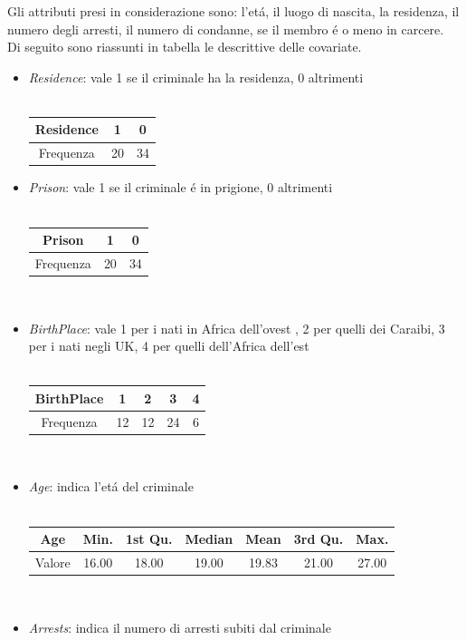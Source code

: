 \documentclass[11pt,a4paper]{report}
\begin{document}
Gli attributi presi in considerazione sono: l'et\'a, il luogo di nascita, la residenza, il numero degli arresti, il numero di condanne, se il membro \'e o meno in carcere.
\\
Di seguito sono riassunti in tabella le descrittive delle covariate.
\begin{itemize}
	\item \emph{Residence}: vale 1 se il criminale ha la residenza, 0 altrimenti\\\\
\begin{tabular}{c|c|c}
	\hline 
	\textbf{Residence} & 1  & 0  \\ 
	\hline 
	Frequenza & 20  &34  \\ 
	\hline 
\end{tabular} 
	\item \emph{Prison}:  vale 1 se il criminale \'e in prigione, 0 altrimenti\\\\
\begin{tabular}{c|c|c}
	\hline 
	\textbf{Prison} & 1  & 0  \\ 
	\hline 
	Frequenza & 20  &34  \\ 
	\hline 
\end{tabular} 
\\
	\item \emph{BirthPlace}: vale 1 per i nati in Africa dell'ovest , 2 per quelli dei Caraibi, 3 per i nati negli UK, 4 per quelli dell'Africa dell'est \\\\
\begin{tabular}{c|c|c|c|c}
	\hline 
	\textbf{BirthPlace} & 1  & 2 & 3& 4  \\
	\hline 
	Frequenza & 12 & 12 & 24 & 6   \\ 
	\hline 
\end{tabular} 
\\
\item \emph{Age}: indica l'et\'a del criminale \\\\
\begin{tabular}{c|c|c|c|c|c |c}
\hline 
\textbf{Age} & Min. & 1st Qu. & Median &   Mean& 3rd Qu. &   Max.    \\ 
\hline 
Valore &  16.00  & 18.00 &  19.00  & 19.83 &  21.00 &  27.00  \\ 
\hline 
\end{tabular} 
\\
\item \emph{Arrests}: indica il numero di arresti subiti dal criminale \\\\

\end{itemize}
\end{document}
